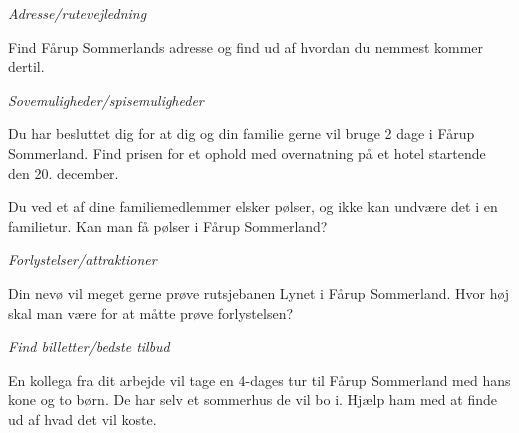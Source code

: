 \documentclass[10pt,a4paper]{article}      %
\begin{document}
\begin{opgaver}
\item {\it Adresse/rutevejledning}
    \begin{opgaver}
    \item Find Fårup Sommerlands adresse og find ud af hvordan du nemmest
    kommer dertil.
    \end{opgaver}

\item {\it Sovemuligheder/spisemuligheder}
    \begin{opgaver}
    \item Du har besluttet dig for at dig og din familie gerne vil bruge 2 dage
    i Fårup Sommerland. Find prisen for et ophold med overnatning på et hotel
    startende den 20. december.
    \item Du ved et af dine familiemedlemmer elsker pølser, og ikke kan undvære det i en familietur. Kan man få pølser i Fårup Sommerland?
    \end{opgaver}

\item {\it Forlystelser/attraktioner}
    \begin{opgaver}
    \item Din nevø vil meget gerne prøve rutsjebanen Lynet i Fårup Sommerland.
    Hvor høj skal man være for at måtte prøve forlystelsen?
    \end{opgaver}

\item {\it Find billetter/bedste tilbud}
    \begin{opgaver}
    \item En kollega fra dit arbejde vil tage en
    4-dages tur til Fårup Sommerland med hans kone og to børn. De har selv et
    sommerhus de vil bo i. Hjælp ham med at finde ud af hvad det vil koste.
    \end{opgaver}


\end{opgaver}
\end{document}
